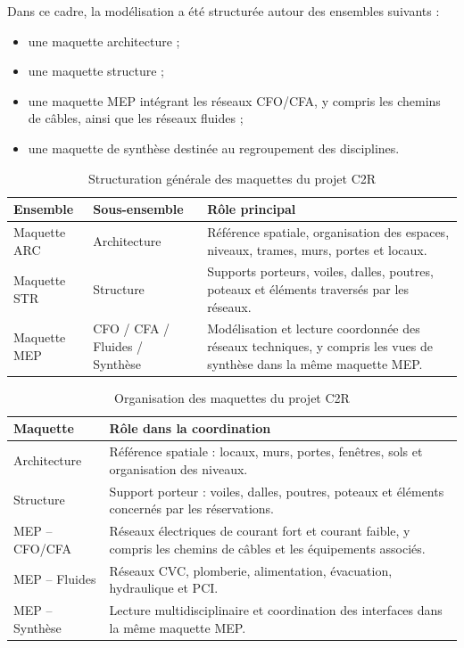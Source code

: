 \documentclass[12pt,a4paper]{report}
\begin{document}
Dans ce cadre, la modélisation a été structurée autour des ensembles suivants :
\begin{itemize}[leftmargin=1.2cm]
    \item une maquette architecture ;
    \item une maquette structure ;
    \item une maquette MEP intégrant les réseaux CFO/CFA, y compris les chemins de câbles, ainsi que les réseaux fluides ;
    \item une maquette de synthèse destinée au regroupement des disciplines.
\end{itemize}

\begin{table}[H]
\centering
\caption{Structuration générale des maquettes du projet C2R}
\begin{tabularx}{0.95\textwidth}{|L{3.6cm}|L{3.6cm}|Y|}
\hline
\textbf{Ensemble} & \textbf{Sous-ensemble} & \textbf{Rôle principal} \\
\hline
Maquette ARC & Architecture & Référence spatiale, organisation des espaces, niveaux, trames, murs, portes et locaux. \\
\hline
Maquette STR & Structure & Supports porteurs, voiles, dalles, poutres, poteaux et éléments traversés par les réseaux. \\
\hline
Maquette MEP & CFO / CFA / Fluides / Synthèse & Modélisation et lecture coordonnée des réseaux techniques, y compris les vues de synthèse dans la même maquette MEP. \\
\hline
\end{tabularx}
\end{table}

\begin{table}[H]
\centering
\caption{Organisation des maquettes du projet C2R}
\begin{tabularx}{0.95\textwidth}{|L{3.8cm}|Y|}
\hline
\textbf{Maquette} & \textbf{Rôle dans la coordination} \\
\hline
Architecture & Référence spatiale : locaux, murs, portes, fenêtres, sols et organisation des niveaux. \\
\hline
Structure & Support porteur : voiles, dalles, poutres, poteaux et éléments concernés par les réservations. \\
\hline
MEP -- CFO/CFA & Réseaux électriques de courant fort et courant faible, y compris les chemins de câbles et les équipements associés. \\
\hline
MEP -- Fluides & Réseaux CVC, plomberie, alimentation, évacuation, hydraulique et PCI. \\
\hline
MEP -- Synthèse & Lecture multidisciplinaire et coordination des interfaces dans la même maquette MEP. \\
\hline
\end{tabularx}
\end{table}
\end{document}
